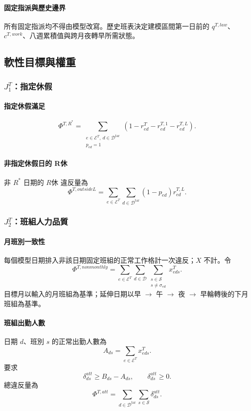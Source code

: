 \documentclass[a4paper,12pt]{article}
\begin{document}
\paragraph{固定指派與歷史邊界}
所有固定指派均不得由模型改寫。歷史班表決定建模區間第一日前的
\(q^{T,law}\)、\(c^{T,work}\)、八週累積值與跨月夜轉早所需狀態。

\subsection{軟性目標與權重}

\subsubsection{\texorpdfstring{$J^T_1$}{J1}：指定休假}

\paragraph{指定休假滿足}
\[
  \Phi^{T,R^*}
  =
  \sum_{\substack{e\in\mathcal{E}^{T},\ d\in\mathcal{D}^{\mathrm{tar}}\\p_{ed}=1}}
  \left(1-r^{T}_{ed}-r^{T,1}_{ed}-r^{T,L}_{ed}\right).
\]

\paragraph{非指定休假日的 R休}
非 \(R^*\) 日期的 \(R休\) 違反量為
\[
  \Phi^{T,outsideL}
  =\sum_{e\in\mathcal{E}^{T}}\sum_{d\in\mathcal{D}^{\mathrm{tar}}}(1-p_{ed})r^{T,L}_{ed}.
\]

\subsubsection{\texorpdfstring{$J^T_2$}{J2}：班組人力品質}

\paragraph{月班別一致性}
每個模型日期排入非該日期固定班組的正常工作格計一次違反；\(X\) 不計。令
\[
  \Phi^{T,nonmonthly}
  =
  \sum_{e\in\mathcal{E}^{T}}
  \sum_{d\in\mathcal{D}}
  \sum_{\substack{s\in\mathcal{S}\\s\neq\sigma_{ed}}}x^{T}_{eds}.
\]
目標月以輸入的月班組為基準；延伸日期以早 \(\rightarrow\) 午 \(\rightarrow\) 夜
\(\rightarrow\) 早輪轉後的下月班組為基準。

\paragraph{班組出勤人數}
日期 \(d\)、班別 \(s\) 的正常出勤人數為
\[
  A_{ds}
  =
  \sum_{e\in\mathcal{E}^{T}}x^{T}_{eds}.
\]
要求
\[
  \delta^{att}_{ds}\geq B_{ds}-A_{ds},
  \qquad
  \delta^{att}_{ds}\geq0.
\]
總違反量為
\[
  \Phi^{T,att}
  =
  \sum_{d\in\mathcal{D}^{\mathrm{tar}}}
  \sum_{s\in\mathcal{S}}\delta^{att}_{ds}.
\]
\end{document}

